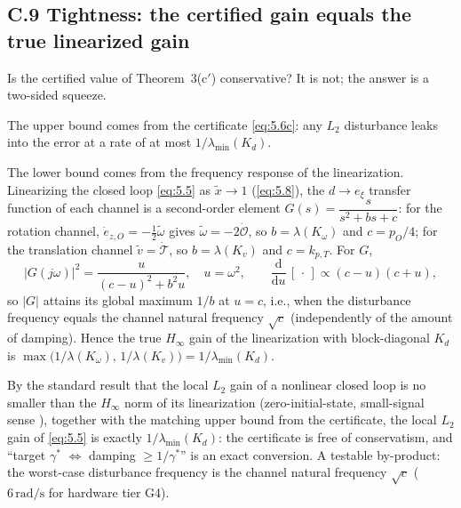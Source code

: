 \subsection*{C.9 Tightness: the certified gain equals the true linearized gain}

Is the certified value of Theorem~3(c$'$) conservative? It is not; the answer is a two-sided squeeze.

The upper bound comes from the certificate \eqref{eq:5.6c}: any $L_2$ disturbance leaks into the error at a rate of at most $1/\lambda_{\min}(K_d)$.

The lower bound comes from the frequency response of the linearization. Linearizing the closed loop \eqref{eq:5.5} as $\tilde x\to1$ (\eqref{eq:5.8}), the $d\to e_\xi$ transfer function of each channel is a second-order element $G(s)=\dfrac{s}{s^2+bs+c}$: for the rotation channel, $\dot e_{z,O}=-\tfrac12\tilde\omega$ gives $\tilde\omega=-2\dot{\mathcal O}$, so $b=\lambda(K_\omega)$ and $c=p_O/4$; for the translation channel $\tilde v=\dot{\mathcal T}$, so $b=\lambda(K_v)$ and $c=k_{p,T}$. For $G$,
\begin{equation}
|G(j\omega)|^2=\frac{u}{(c-u)^2+b^2u},\quad u=\omega^2,\qquad
\frac{\mathrm{d}}{\mathrm{d}u}\,[\,\cdot\,]\propto(c-u)(c+u),
\tag{5.10}\label{eq:5.10}
\end{equation}
so $|G|$ attains its global maximum $1/b$ at $u=c$, i.e., when the disturbance frequency equals the channel natural frequency $\sqrt c$ (independently of the amount of damping). Hence the true $H_\infty$ gain of the linearization with block-diagonal $K_d$ is $\max\bigl(1/\lambda(K_\omega),\,1/\lambda(K_v)\bigr)=1/\lambda_{\min}(K_d)$.

By the standard result that the local $L_2$ gain of a nonlinear closed loop is no smaller than the $H_\infty$ norm of its linearization (zero-initial-state, small-signal sense \cite{VdS00}), together with the matching upper bound from the certificate, the local $L_2$ gain of \eqref{eq:5.5} is exactly $1/\lambda_{\min}(K_d)$: the certificate is free of conservatism, and ``target $\gamma^{*}$ $\Leftrightarrow$ damping $\ge 1/\gamma^{*}$'' is an exact conversion. A testable by-product: the worst-case disturbance frequency is the channel natural frequency $\sqrt c$ ($6\,\mathrm{rad/s}$ for hardware tier G4).
